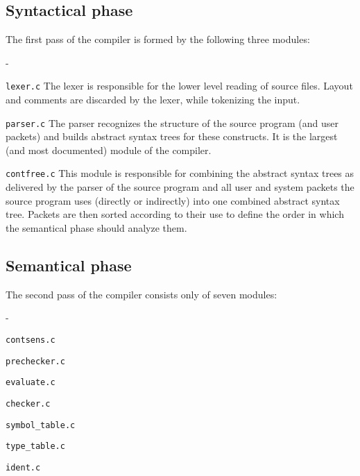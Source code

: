 \documentclass [a4paper,12pt,fleqn]{article}
\begin{document}
\subsection {Syntactical phase}
The first pass of the compiler is formed by the following three modules:
\begin {list}{-}{}
\item [ {\tt lexer.c} ]
The lexer is responsible for the lower level reading of \ELAN source files.
Layout and comments are discarded by the lexer, while tokenizing the input.
\item [ {\tt parser.c} ]
The parser recognizes the structure of the source program (and user packets)
and builds abstract syntax trees for these constructs. It is the largest
(and most documented) module of the \ELAN compiler.
\item [ {\tt contfree.c} ]
This module is responsible for combining the abstract syntax trees as
delivered by the parser of the source program and all user and system
packets the source program uses (directly or indirectly) into one
combined abstract syntax tree. Packets are then sorted according to their
use to define the order in which the semantical phase should analyze them.
\end{list}
\subsection {Semantical phase}
The second pass of the compiler consists only of seven modules:
\begin {list}{-}{}
\item [ {\tt contsens.c} ]
\item [ {\tt prechecker.c} ]
\item [ {\tt evaluate.c} ]
\item [ {\tt checker.c} ]
\item [ {\tt symbol\_table.c} ]
\item [ {\tt type\_table.c} ]
\item [ {\tt ident.c} ]
\end{list}
\end{document}
